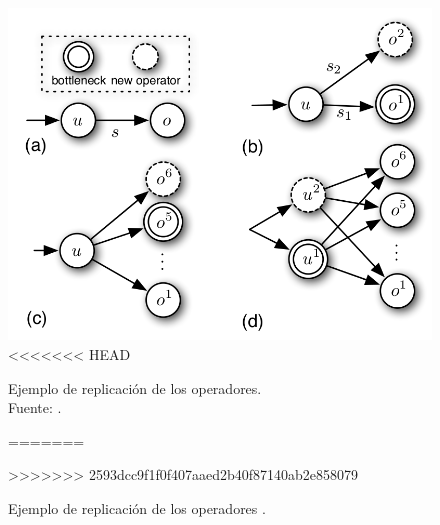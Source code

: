 \begin{figure}[!ht]
	\centering
	\includegraphics[scale=0.3]{images/EjFision.png}
<<<<<<< HEAD
	\caption[Ejemplo de replicación de los operadores.]{Ejemplo de replicación de los operadores.\\Fuente: \cite{FernandezMKP13}.}
=======
	\caption{Ejemplo de replicaci\'on de los operadores \citep{FernandezMKP13}.}
>>>>>>> 2593dcc9f1f0f407aaed2b40f87140ab2e858079
	\label{fig:ejFision}
\end{figure}
